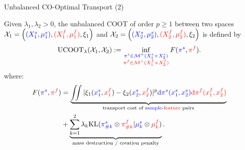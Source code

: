 \documentclass{beamer}
\newcommand{\ucoot}{\text{UCOOT}}
\newcommand{\cX}{\mathcal X}
\newcommand{\cM}{\mathcal M}
\newcommand{\pis}{{\color{blue}{\pi^s}}}
\newcommand{\pif}{{\color{red}{\pi^f}}}
\newcommand{\sfspace}{{\color{blue}{s.}}{\color{red}{f. }}}
\begin{document}
\begin{frame}{Unbalanced CO-Optimal Transport (2)}
\scriptsize
\vspace{-1cm}
\begin{definition}[UCOOT]
    Given $\lambda_1, \lambda_2 >0$, the unbalanced COOT of order $p \geq 1$
    between two \sfspace spaces $\cX_1 = \left({\color{blue}{(X_1^s, \mu_1^s)}}, {\color{red}{(X_1^f, \mu_1^f)}}, \xi_1 \right)$
    and $\cX_2 = \left({\color{blue}{(X_2^s, \mu_2^s)}}, {\color{red}{(X_2^f, \mu_2^f)}}, \xi_2 \right)$ is defined by
\begin{align*}
\label{eq:ucoot}
    \ucoot_{\lambda}(\cX_1, \cX_2) :=
  \inf_{\substack{{\color{blue}{\pi^s \in \cM^+(X_1^s \times X_2^s)}}
  \\ {\color{red}{\pi^f \in \cM^+(X_1^f \times X_2^f)}}}}
  F(\pis, \pif).
\end{align*}
\vspace{-0.8cm}
where:
\begin{align*}
    F(\pis, \pif) &= \underbrace{\iint
    |\xi_1({\color{blue}{x_1^s}}, {\color{red}{x_1^f}}) - \xi_2({\color{blue}{x_2^s}}, {\color{red}{x_2^f}})|^p {\color{blue}{\mathrm d\pi^s(x_1^s, x_2^s)}}
    {\color{red}{\mathrm d \pi^f(x_1^f, x_2^f)}}}_{\text{transport cost of {\color{blue}{sample}}-{\color{red}{feature}} pairs}} \\
    &+ \underbrace{\sum_{k=1}^2\lambda_k \text{KL}({\color{blue}{\pi^s_{\# k}}} \otimes {\color{red}{\pi^f_{\# k}}} \vert {\color{blue}{\mu^s_k}} \otimes {\color{red}{\mu^f_k}})}_{\text{mass destruction / creation penalty}}.
\end{align*}
\end{definition}


\end{frame}
\end{document}

